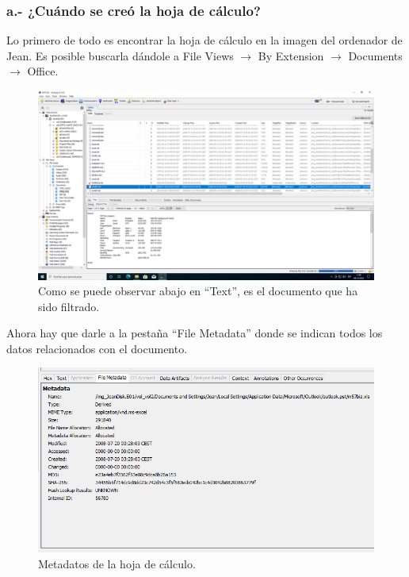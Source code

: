 \documentclass{article}
\begin{document}
\subsubsection{a.- ¿Cuándo se creó la hoja de cálculo?}

Lo primero de todo es encontrar la hoja de cálculo en la imagen del ordenador de Jean. Es posible buscarla dándole a File Views $\rightarrow$ By Extension $\rightarrow$ Documents $\rightarrow$ Office.

\begin{figure}[H]
    \centering
    \includegraphics[width=\textwidth]{imagenes/Windows/Captura de pantalla (5).png}
    \caption{Como se puede observar abajo en ``Text'', es el documento que ha sido filtrado.}
\end{figure}

\newpage

Ahora hay que darle a la pestaña ``File Metadata'' donde se indican todos los datos relacionados con el documento.

\begin{figure}[H]
    \centering
    \includegraphics[width=\textwidth]{imagenes/Windows/Captura de pantalla (6).png}
    \caption{Metadatos de la hoja de cálculo.}
\end{figure}
\end{document}
